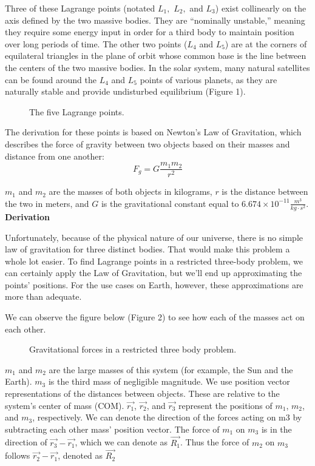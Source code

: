 \documentclass[10pt,a4paper]{article}
\begin{document}
Three of these Lagrange points (notated $L_1,$ $L_2,$ and $L_3$) exist collinearly on the axis defined by the two massive bodies. They are “nominally unstable,” meaning they require some energy input in order for a third body to maintain position over long periods of time. The other two points ($L_4$ and $L_5$) are at the corners of equilateral triangles in the plane of orbit whose common base is the line between the centers of the two massive bodies. In the solar system, many natural satellites can be found around the $L_4$ and $L_5$ points of various planets, as they are naturally stable and provide undisturbed equilibrium (Figure 1). 

\begin{figure}[h]
  \caption{The five Lagrange points.}
  \label{fig:1}
\end{figure}

The derivation for these points is based on Newton’s Law of Gravitation, which describes the force of gravity between two objects based on their masses and distance from one another: \[F_g = G\frac{m_1m_2}{r^2}\]

$m_1$ and $m_2$ are the masses of both objects in kilograms, $r$ is the distance between the two in meters, and $G$ is the gravitational constant equal to $6.674\times{10^{-11}} \frac{m^3}{kg\cdot{}s^2}$.
\newline\newline
\textbf{Derivation}
\newline

Unfortunately, because of the physical nature of our universe, there is no simple law of gravitation for three distinct bodies. That would make this problem a whole lot easier. To find Lagrange points in a restricted three-body problem, we can certainly apply the Law of Gravitation, but we’ll end up approximating the points’ positions. For the use cases on Earth, however, these approximations are more than adequate. 

We can observe the figure below (Figure 2) to see how each of the masses act on each other. 

\begin{figure}[h]
  \caption{Gravitational forces in a restricted three body problem.}
  \label{fig:2}
\end{figure}

$m_1$ and $m_2$ are the large masses of this system (for example, the Sun and the Earth). $m_3$ is the third mass of negligible magnitude. We use position vector representations of the distances between objects. These are relative to the system’s center of mass (COM). $\vec{r_1}$, $\vec{r_2}$, and $\vec{r_3}$ represent the positions of $m_1$, $m_2$, and $m_3$, respectively. We can denote the direction of the forces acting on m3 by subtracting each other mass’ position vector. The force of $m_1$ on $m_3$ is in the direction of $\vec{r_3}-\vec{r_1}$, which we can denote as $\vec{R_1}$. Thus the force of $m_2$ on $m_3$ follows $\vec{r_2}-\vec{r_1}$, denoted as $\vec{R_2}$
\end{document}
